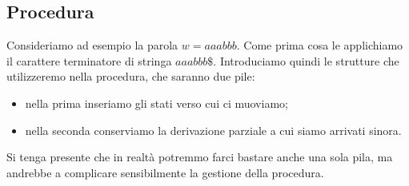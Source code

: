 \documentclass[class=book, crop=false, oneside, 12pt]{standalone}
\begin{document}
\subsection{Procedura}
Consideriamo ad esempio la parola \(w = aaabbb\). Come prima cosa le applichiamo il carattere terminatore di stringa \(aaabbb\$\). Introduciamo quindi le strutture che utilizzeremo nella procedura, che saranno due pile:
\begin{itemize}
    \item nella prima inseriamo gli stati verso cui ci muoviamo;
    \item nella seconda conserviamo la derivazione parziale a cui siamo arrivati sinora.
\end{itemize}
Si tenga presente che in realtà potremmo farci bastare anche una sola pila, ma andrebbe a complicare sensibilmente la gestione della procedura.
\end{document}
